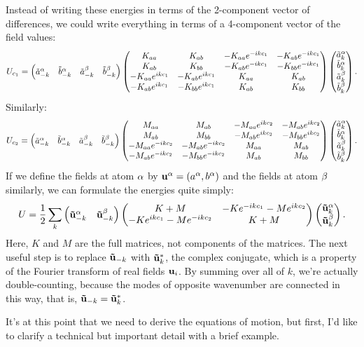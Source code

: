 \documentclass[12pt]{article}
\begin{document}
Instead of writing these energies in terms of the 2-component vector of 
differences, we could write everything in terms of a 4-component vector of the 
field values:
\[ U_{c_1} = \left(\begin{matrix}\tilde a^\alpha_{-k} & \tilde b^\alpha_{-k} & \tilde a^\beta_{-k} & 
\tilde b^\beta_{-k}\end{matrix}\right) \left(\begin{matrix} K_{aa} & K_{ab} & -K_{aa} e^{-ikc_1} & -K_{ab} 
e^{-ikc_1} \\
K_{ab} & K_{bb} & -K_{ab}e^{-ikc_1} & -K_{bb}e^{-ikc_1} \\ -K_{aa} e^{ikc_1} & 
-K_{ab} e^{ikc_1} & K_{aa} & K_{ab} \\ -K_{ab} e^{ikc_1} & -K_{bb}e^{ikc_1} 
& K_{ab} & K_{bb} \end{matrix}\right) \left(\begin{matrix}\tilde a^\alpha_k \\ \tilde b^\alpha_k \\ \tilde a^\beta_k \\ 
\tilde b^\beta_k\end{matrix}\right).\]
Similarly:
\[ U_{c_2} = \left(\begin{matrix}\tilde a^\alpha_{-k} & \tilde b^\alpha_{-k} & \tilde a^\beta_{-k} & 
\tilde b^\beta_{-k}\end{matrix}\right) \left(\begin{matrix} M_{aa} & M_{ab} & -M_{aa} e^{ikc_2} & -M_{ab} 
e^{ikc_2} \\
M_{ab} & M_{bb} & -M_{ab}e^{ikc_2} & -M_{bb}e^{ikc_2} \\ -M_{aa} e^{-ikc_2} & 
-M_{ab} e^{-ikc_2} & M_{aa} & M_{ab} \\ -M_{ab} e^{-ikc_2} & -M_{bb}e^{-ikc_2} 
& M_{ab} & M_{bb} \end{matrix}\right) \left(\begin{matrix}\tilde a^\alpha_k \\ \tilde b^\alpha_k \\ \tilde a^\beta_k \\ 
\tilde b^\beta_k\end{matrix}\right).\]
If we define the fields at atom $\alpha$ by $\mathbf{u}^\alpha = \left( a^\alpha, b^\alpha\right)$ and 
the fields at atom $\beta$ similarly, we can formulate the energies quite simply:
\[ U = \frac{1}{2} \sum_k \left(\begin{matrix} \mathbf{\tilde u}^\alpha_{-k} & \mathbf{\tilde u}^\beta_{-k}\end{matrix}\right) 
\left(\begin{matrix} K + M & - K e^{-ikc_1} - Me^{ikc_2} \\ - Ke^{ikc_1} - Me^{-ikc_2} & 
K+M\end{matrix}\right) \left(\begin{matrix} \mathbf{\tilde u}^\alpha_k \\ \mathbf{\tilde u}^\beta_k \end{matrix}\right).\]
Here, $K$ and $M$ are the full matrices, not components of the matrices. The 
next useful step is to replace $\mathbf{\tilde u}_{-k}$ with $\mathbf{\tilde u}_k^*$, 
the complex conjugate, which is a property of the Fourier transform of real 
fields $\mathbf{u}_i$. By summing over all of $k$, we're actually double-counting, 
because the modes of opposite wavenumber are connected in this way, that is, 
$\mathbf{\tilde u}_{-k} = \mathbf{\tilde u}_k^*$.

It's at this point that we need to derive the equations of motion, but first, 
I'd like to clarify a technical but important detail with a brief example.
\end{document}

